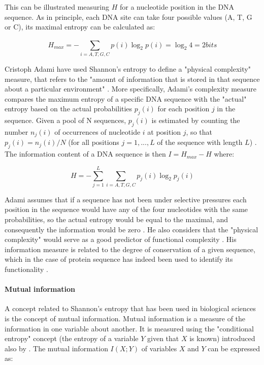 This can be illustrated measuring $H$ for a nucleotide position in the DNA sequence. As in principle, each DNA site can take four possible values (A, T, G or C), its maximal entropy can be calculated as:

$$H_{max} = -\sum_{i=A,T,G,C}^{} p(i) \log_{2} p(i) = \log_{2} 4 = 2 bits $$

Cristoph Adami have used Shannon's entropy to define a "physical complexity" measure, that refers to the "amount of information that is stored in that sequence about a particular environment" \citep{Adami2002}.
%
More specifically, Adami's complexity measure compares the maximum entropy of a specific DNA sequence with the "actual" entropy based on the actual probabilities $p_{j}(i)$ for each position $j$ in the sequence. Given a pool of N sequences, $p_{j}(i)$ is estimated by counting the number $n_{j}(i)$  of occurrences of nucleotide $i$ at position $j$, so that $p_{j}(i)=n_{j}(i)/N$ (for all positions $j =1,...,L$ of the sequence with length $L$) \citep{Adami2000}. 
The information content of a DNA sequence is then $I = H_{max} - H $  where:

$$H = -\sum_{j=1}^{L} \sum_{i=A,T,G,C}^{} p_{j}(i) \log_{2} p_{j}(i) $$

Adami assumes that if a sequence has not been under selective pressures each position in the sequence would have any of the four nucleotides with the same probabilities, so the actual entropy would be equal to the maximal, and consequently the information would be zero \citep{Adami2002}. 
He also considers that the "physical complexity" would serve as a good predictor of functional complexity \citep{Adami2004}. 
His information measure is related to the degree of conservation of a given sequence, which in the case of protein sequence has indeed been used to identify its functionality \citep{Casari1995,Kellis2003,Hannenhalli2000}.


\paragraph{Mutual information}

A concept related to Shannon's entropy that has been used in biological sciences is the concept of mutual information. Mutual information is a measure of the information in one variable about another. It is measured using the "conditional entropy" concept (the entropy of a variable $Y$ given that $X$ is known)  introduced also by \citet{Shannon1948}.
The mutual information $I(X;Y)$ of variables $X$ and $Y$ can be expressed as:
 
